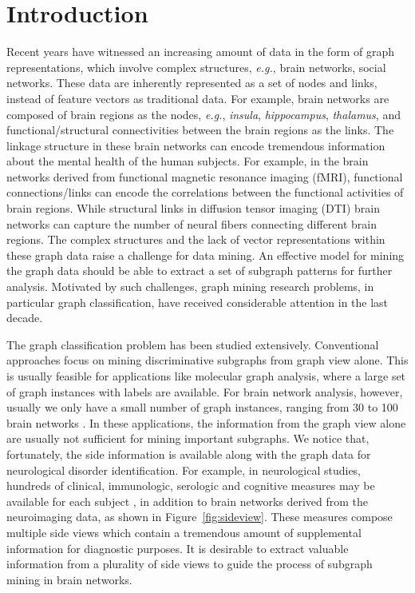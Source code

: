 \documentclass[conference]{IEEEtran}
\begin{document}
\section{Introduction}\label{sec:intro}
Recent years have witnessed an increasing amount of data in the form of graph representations, which involve complex structures, \emph{e.g.}, brain networks, social networks. These data are inherently represented as a set of nodes and links, instead of feature vectors as traditional data. For example, brain networks are composed of brain regions as the nodes, \emph{e.g.}, \emph{insula}, \emph{hippocampus}, \emph{thalamus}, and functional/structural connectivities between the brain regions as the links. The linkage structure in these brain networks can encode tremendous information about the mental health of the human subjects. For example, in the brain networks derived from functional magnetic resonance imaging (fMRI), functional connections/links can encode the correlations between the functional activities of brain regions. While structural links in diffusion tensor imaging (DTI) brain networks can capture the number of neural fibers connecting different brain regions. The complex structures and the lack of vector representations within these graph data raise a challenge for data mining. An effective model for mining the graph data should be able to extract a set of subgraph patterns for further analysis. Motivated by such challenges, graph mining research problems, in particular graph classification, have received considerable attention in the last decade.

The graph classification problem has been studied extensively. Conventional approaches focus on mining discriminative subgraphs from graph view alone. This is usually feasible for applications like molecular graph analysis, where a large set of graph instances with labels are available. For brain network analysis, however, usually we only have a small number of graph instances, ranging from 30 to 100 brain networks \cite{kong2013discriminative}. In these applications, the information from the graph view alone are usually not sufficient for mining important subgraphs. We notice that, fortunately, the side information is available along with the graph data for neurological disorder identification. For example, in neurological studies, hundreds of clinical, immunologic, serologic and cognitive measures may be available for each subject \cite{cao2014tensor,cao2015determinants}, in addition to brain networks derived from the neuroimaging data, as shown in Figure~\ref{fig:sideview}. These measures compose multiple side views which contain a tremendous amount of supplemental information for diagnostic purposes. It is desirable to extract valuable information from a plurality of side views to guide the process of subgraph mining in brain networks.
\end{document}
